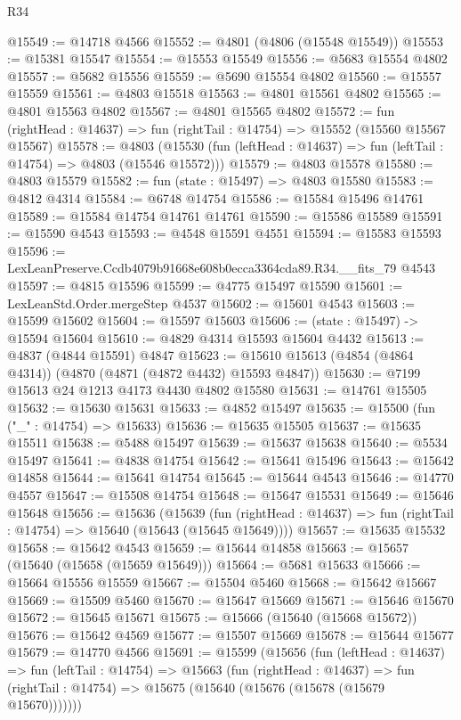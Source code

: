 \begin{lexlean}{R34}
\begin{coremodule}
@15549 := @14718 @4566
@15552 := @4801 (@4806 (@15548 @15549))
@15553 := @15381 @15547
@15554 := @15553 @15549
@15556 := @5683 @15554 @4802
@15557 := @5682 @15556
@15559 := @5690 @15554 @4802
@15560 := @15557 @15559
@15561 := @4803 @15518
@15563 := @4801 @15561 @4802
@15565 := @4801 @15563 @4802
@15567 := @4801 @15565 @4802
@15572 := fun (rightHead : @14637) => fun (rightTail : @14754) => @15552 (@15560 @15567 @15567)
@15578 := @4803
    (@15530 (fun (leftHead : @14637) => fun (leftTail : @14754) => @4803 (@15546 @15572)))
@15579 := @4803 @15578
@15580 := @4803 @15579
@15582 := fun (state : @15497) => @4803 @15580
@15583 := @4812 @4314
@15584 := @6748 @14754
@15586 := @15584 @15496 @14761
@15589 := @15584 @14754 @14761 @14761
@15590 := @15586 @15589
@15591 := @15590 @4543
@15593 := @4548 @15591 @4551
@15594 := @15583 @15593
@15596 := LexLeanPreserve.Ccdb4079b91668e608b0ecca3364cda89.R34.__fits_79 @4543
@15597 := @4815 @15596
@15599 := @4775 @15497 @15590
@15601 := LexLeanStd.Order.mergeStep @4537
@15602 := @15601 @4543
@15603 := @15599 @15602
@15604 := @15597 @15603
@15606 := (state : @15497) -> @15594 @15604
@15610 := @4829 @4314 @15593 @15604 @4432
@15613 := @4837 (@4844 @15591) @4847
@15623 := @15610 @15613 (@4854 (@4864 @4314)) (@4870 (@4871 (@4872 @4432) @15593 @4847))
@15630 := @7199 @15613 @24 @1213 @4173 @4430 @4802 @15580
@15631 := @14761 @15505
@15632 := @15630 @15631
@15633 := @4852 @15497
@15635 := @15500 (fun ("_" : @14754) => @15633)
@15636 := @15635 @15505
@15637 := @15635 @15511
@15638 := @5488 @15497
@15639 := @15637 @15638
@15640 := @5534 @15497
@15641 := @4838 @14754
@15642 := @15641 @15496
@15643 := @15642 @14858
@15644 := @15641 @14754
@15645 := @15644 @4543
@15646 := @14770 @4557
@15647 := @15508 @14754
@15648 := @15647 @15531
@15649 := @15646 @15648
@15656 := @15636
    (@15639
      (fun (rightHead : @14637) => fun (rightTail : @14754) => @15640 (@15643 (@15645 @15649))))
@15657 := @15635 @15532
@15658 := @15642 @4543
@15659 := @15644 @14858
@15663 := @15657 (@15640 (@15658 (@15659 @15649)))
@15664 := @5681 @15633
@15666 := @15664 @15556 @15559
@15667 := @15504 @5460
@15668 := @15642 @15667
@15669 := @15509 @5460
@15670 := @15647 @15669
@15671 := @15646 @15670
@15672 := @15645 @15671
@15675 := @15666 (@15640 (@15668 @15672))
@15676 := @15642 @4569
@15677 := @15507 @15669
@15678 := @15644 @15677
@15679 := @14770 @4566
@15691 := @15599
    (@15656
      (fun (leftHead : @14637) =>
      fun (leftTail : @14754) =>
      @15663
        (fun (rightHead : @14637) =>
        fun (rightTail : @14754) => @15675 (@15640 (@15676 (@15678 (@15679 @15670)))))))

\end{coremodule}
\end{lexlean}
